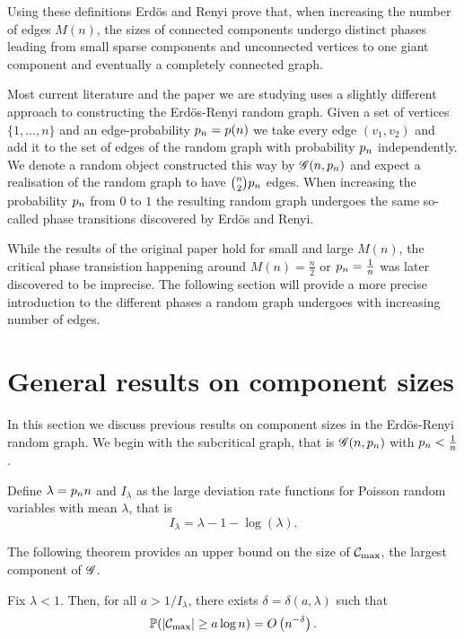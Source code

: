 Using these definitions Erdös and Renyi prove that,
when increasing the number of edges $M(n)$,
the sizes of connected components undergo distinct phases leading from small sparse components and unconnected vertices
to one giant component and eventually a completely connected graph.

Most current literature and the paper we are studying uses a slightly different approach to constructing the Erdös-Renyi random graph.
Given a set of vertices $\{1, \dots, n\}$ and an edge-probability $p_n = p(n)$
we take every edge $(v_1, v_2)$ and add it to the set of edges of the random graph with probability $p_n$ independently.
We denote a random object constructed this way by $\mathscr{G}(n, p_n)$ and expect a realisation of the random graph to have $\binom{n}{2}p_n$ edges.
When increasing the probability $p_n$ from $0$ to $1$ the resulting random graph undergoes the same so-called phase transitions
discovered by Erdös and Renyi.

While the results of the original paper hold for small and large $M(n)$,
the critical phase transistion happening around $M(n) = \frac{n}{2}$ or $p_n = \frac{1}{n}$
was later discovered to be imprecise.
The following section will provide a more precise introduction to the different phases a random graph undergoes
with increasing number of edges.


\section{General results on component sizes}

In this section we discuss previous results on component sizes in the Erdös-Renyi random graph.
We begin with the subcritical graph, that is
$\mathscr{G}(n, p_n)$ with $p_n < \frac{1}{n}$.

Define $\lambda = p_n n$ and $I_{\lambda}$ as the large deviation rate functions for Poisson random variables with mean $\lambda$,
that is
\begin{equation}
	I_{\lambda} = \lambda - 1 - \log(\lambda).
\end{equation}

The following theorem provides an upper bound on the size of $\mathcal{C}_{\max}$, the largest component of $\mathscr{G}$.
\begin{theorem}
	Fix $\lambda < 1$. 
	Then, for all $a > 1/I_{\lambda}$, 
	there exists $\delta = \delta(a, \lambda)$ such that
	\begin{equation}
		\mathbb{P}( |\mathcal{C}_{\max}| \geq a \log n ) = O\left(n^{-\delta}\right).
	\end{equation}
\end{theorem}

